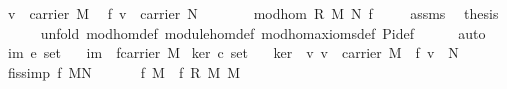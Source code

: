 \begin{isabellebody}
\ {\isachardoublequoteopen}v\ {\isasymin}\ carrier\ M{\isachardoublequoteclose}\ \isanewline
{}\ {\isachardoublequoteopen}f\ v\ {\isasymin}\ carrier\ N{\isachardoublequoteclose}\isanewline
%
\isadelimproof
%
\endisadelimproof
%
\isatagproof
{}\isamarkupfalse%
\ {\isacharminus}\ \isanewline
\ \ \isamarkupfalse%
\ {}{\isacharcolon}\ {\isachardoublequoteopen}mod{\isacharunderscore}hom\ R\ M\ N\ f{\isachardoublequoteclose}\isacommand{{\isachardot}{\isachardot}}\isamarkupfalse%
\isanewline
\ \ \isamarkupfalse%
\ {}\ assms\ \isamarkupfalse%
\ {\isacharquery}thesis\isanewline
\ \ \ \ \isamarkupfalse%
\ {\isacharparenleft}unfold\ mod{\isacharunderscore}hom{\isacharunderscore}def\ module{\isacharunderscore}hom{\isacharunderscore}def\ mod{\isacharunderscore}hom{\isacharunderscore}axioms{\isacharunderscore}def\ Pi{\isacharunderscore}def{\isacharparenright}\isanewline
\ \ \ \ \isamarkupfalse%
\ auto\isanewline
{}\isamarkupfalse%
%
\endisatagproof
{\isafoldproof}%
%
\isadelimproof
\isanewline
%
\endisadelimproof
\isanewline
{}\isamarkupfalse%
\ im{\isacharcolon}{\isacharcolon}\ {\isachardoublequoteopen}{\isacharprime}e\ set{\isachardoublequoteclose}\isanewline
\ \ \ {\isachardoublequoteopen}im\ {\isacharequal}\ f{\isacharbackquote}{\isacharparenleft}carrier\ M{\isacharparenright}{\isachardoublequoteclose}\isanewline
\isanewline
{}\isamarkupfalse%
\ ker{\isacharcolon}{\isacharcolon}\ {\isachardoublequoteopen}{\isacharprime}c\ set{\isachardoublequoteclose}\isanewline
\ \ \ {\isachardoublequoteopen}ker\ {\isacharequal}\ {\isacharbraceleft}v{\isachardot}\ v\ {\isasymin}\ carrier\ M\ {\isacharampersand}\ f\ v\ {\isacharequal}\ {\isasymzero}\isactrlbsub N\isactrlesub {\isacharbraceright}{\isachardoublequoteclose}\isanewline
\isanewline
{}\isamarkupfalse%
\ f{}{\isacharunderscore}is{\isacharunderscore}{}{\isacharbrackleft}simp{\isacharbrackright}{\isacharcolon}\ {\isachardoublequoteopen}f\ {\isasymzero}\isactrlbsub M\isactrlesub {\isacharequal}{\isasymzero}\isactrlbsub N\isactrlesub {\isachardoublequoteclose}\isanewline
%
\isadelimproof
%
\endisadelimproof
%
\isatagproof
{}\isamarkupfalse%
\ {\isacharminus}\isanewline
\ \ \isamarkupfalse%
\ {}{\isacharcolon}\ {\isachardoublequoteopen}f\ {\isasymzero}\isactrlbsub M\isactrlesub \ {\isacharequal}\ f\ {\isacharparenleft}{\isasymzero}\isactrlbsub R\isactrlesub \ {\isasymodot}\isactrlbsub M\isactrlesub \ {\isasymzero}\isactrlbsub M\isactrlesub {\isacharparenright}{\isachardoublequoteclose}\ \isamarkupfalse%

\end{isabellebody}
